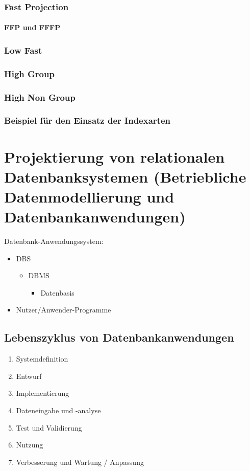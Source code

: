 \subsection{Fast Projection}
\subsubsection{FFP und FFFP}
\subsection{Low Fast}

\subsection{High Group}

\subsection{High Non Group}

\subsection{Beispiel für den Einsatz der Indexarten}

\chapter{Projektierung von relationalen Datenbanksystemen (Betriebliche Datenmodellierung und Datenbankanwendungen)}
Datenbank-Anwendungssystem:
\begin{itemize}
\item DBS
\begin{itemize}
\item DBMS
\begin{itemize}
\item Datenbasis
\end{itemize}
\end{itemize}
\item Nutzer/Anwender-Programme
\end{itemize}
\section{Lebenszyklus von Datenbankanwendungen}
\begin{enumerate}
\item Systemdefinition
\item Entwurf
\item Implementierung
\item Dateneingabe und -analyse
\item Test und Validierung
\item Nutzung
\item Verbesserung und Wartung / Anpassung
\end{enumerate}
